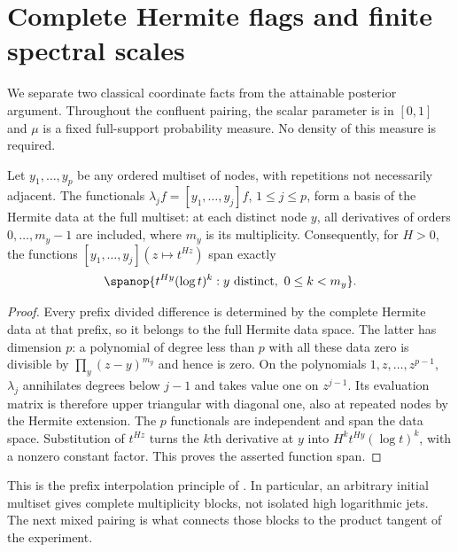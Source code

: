 \section{Complete Hermite flags and finite spectral scales}\label{sec:classical-flag}
We separate two classical coordinate facts from the attainable posterior
argument. Throughout the confluent pairing, the scalar parameter is in
$[0,1]$ and $\mu$ is a fixed full-support probability measure. No density
of this measure is required.

\begin{lemma}\label{lem:hermite-prefix}
Let $y_1,\ldots,y_p$ be any ordered multiset of nodes, with repetitions
not necessarily adjacent. The functionals
$\lambda_jf=[y_1,\ldots,y_j]f$, $1\le j\le p$, form a basis of
the Hermite data at the full multiset: at each distinct node $y$, all
derivatives of orders $0,\ldots,m_y-1$ are included, where $m_y$ is
its multiplicity. Consequently, for $H>0$, the functions
$[y_1,\ldots,y_j](z\mapsto t^{Hz})$ span exactly
\[
 \spanop\{t^{Hy}(\log t)^k:
                 y\text{ distinct},\ 0\le k<m_y\}.
\]
\end{lemma}
\begin{proof}
Every prefix divided difference is determined by the complete Hermite
data at that prefix, so it belongs to the full Hermite data space.
The latter has dimension $p$: a polynomial of degree less than $p$
with all these data zero is divisible by
$\prod_y(z-y)^{m_y}$ and hence is zero. On the polynomials
$1,z,\ldots,z^{p-1}$, $\lambda_j$ annihilates degrees below $j-1$
and takes value one on $z^{j-1}$. Its evaluation matrix is therefore
upper triangular with diagonal one, also at repeated nodes by the Hermite
extension. The $p$ functionals are independent and span the data space.
Substitution of $t^{Hz}$ turns the $k$th derivative at $y$ into
$H^kt^{Hy}(\log t)^k$, with a nonzero constant factor. This proves
the asserted function span.
\end{proof}

This is the prefix interpolation principle of
\cite[Proposition 7, p.~48]{deBoor}. In particular, an arbitrary initial
multiset gives complete multiplicity blocks, not isolated high logarithmic
jets. The next mixed pairing is what connects those blocks to the product
tangent of the experiment.

